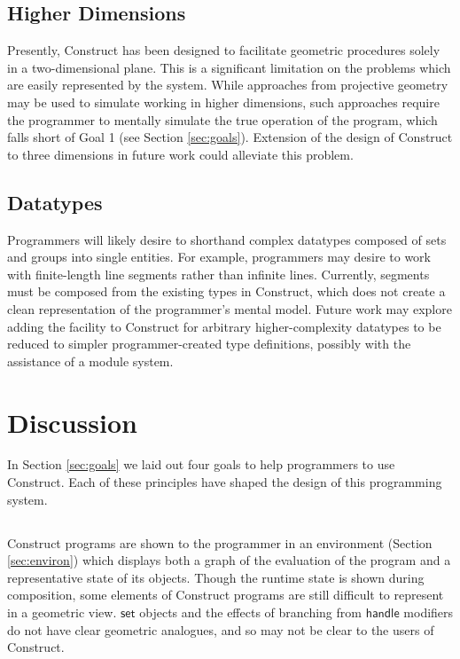 \documentclass[twoside,openright,11pt]{report}
\begin{document}
\subsection{Higher Dimensions}

Presently, Construct has been designed to facilitate geometric procedures solely in a two-dimensional plane. 
This is a significant limitation on the problems which are easily represented by the system. 
While approaches from projective geometry may be used to simulate working in higher dimensions, such approaches require the programmer to mentally simulate the true operation of the program, which falls short of Goal 1 (see Section \ref{sec:goals}).
Extension of the design of Construct to three dimensions in future work could alleviate this problem.

\subsection{Datatypes}

Programmers will likely desire to shorthand complex datatypes composed of sets and groups into single entities. 
For example, programmers may desire to work with finite-length line segments rather than infinite lines.
Currently, segments must be composed from the existing types in Construct, which does not create a clean representation of the programmer's mental model.
Future work may explore adding the facility to Construct for arbitrary higher-complexity datatypes to be reduced to simpler programmer-created type definitions, possibly with the assistance of a module system.

\section{Discussion}
\label{sec:discuss}

In Section \ref{sec:goals} we laid out four goals to help programmers to use Construct. Each of these principles have shaped the design of this programming system.

\subsection{\constructgoalsclear}

Construct programs are shown to the programmer in an environment (Section \ref{sec:environ}) which displays both a graph of the evaluation of the program and a representative state of its objects.
Though the runtime state is shown during composition, some elements of Construct programs are still difficult to represent in a geometric view. 
$\mathsf{set}$ objects and the effects of branching from $\mathsf{handle}$ modifiers do not have clear geometric analogues, and so may not be clear to the users of Construct.
\end{document}

